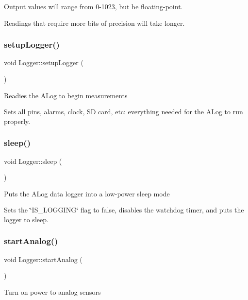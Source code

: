 Output values will range from 0-\/1023, but be floating-\/point.

Readings that require more bits of precision will take longer.\mbox{\label{classLogger_ab5e0bd543758c65a17b77553a0e9f0c9}} 
\subsubsection{\texorpdfstring{setup\+Logger()}{setupLogger()}}
{\footnotesize\ttfamily void Logger\+::setup\+Logger (\begin{DoxyParamCaption}{ }\end{DoxyParamCaption})}

Readies the A\+Log to begin measurements

Sets all pins, alarms, clock, SD card, etc\+: everything needed for the A\+Log to run properly.\mbox{\label{classLogger_ad90ff8f29410f6b70cc6334391400a4e}} 
\subsubsection{\texorpdfstring{sleep()}{sleep()}}
{\footnotesize\ttfamily void Logger\+::sleep (\begin{DoxyParamCaption}{ }\end{DoxyParamCaption})}

Puts the A\+Log data logger into a low-\/power sleep mode

Sets the \char`\"{}\+I\+S\+\_\+\+L\+O\+G\+G\+I\+N\+G\char`\"{} flag to false, disables the watchdog timer, and puts the logger to sleep.\mbox{\label{classLogger_af936c7f58e23316abb5614cbd31c7ced}} 
\subsubsection{\texorpdfstring{start\+Analog()}{startAnalog()}}
{\footnotesize\ttfamily void Logger\+::start\+Analog (\begin{DoxyParamCaption}{ }\end{DoxyParamCaption})}

Turn on power to analog sensors\mbox{\label{classLogger_a4a6c78dd1715b33ae4bbd6f66f116f77}} 
